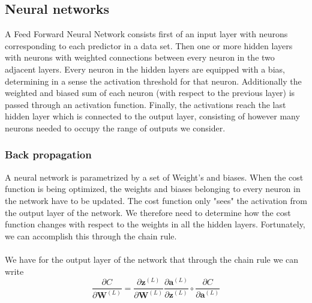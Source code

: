\documentclass[11pt,a4paper,titlepage]{article}
\begin{document}
\subsection{Neural networks}
A Feed Forward Neural Network consists first of an input layer with neurons corresponding to each predictor in a data set. Then one or more hidden layers with neurons with weighted connections between every neuron in the two adjacent layers. Every neuron in the hidden layers are equipped with a bias, determining in a sense the activation threshold for that neuron. Additionally the weighted and biased sum of each neuron (with respect to the previous layer) is passed through an activation function. Finally, the activations reach the last hidden layer which is connected to the output layer, consisting of however many neurons needed to occupy the range of outputs we consider. 
\subsubsection{Back propagation}
A neural network is parametrized by a set of Weight's and biases. When the cost function is being optimized, the weights and biases belonging to every neuron in the network have to be updated. The cost function only "sees" the activation from the output layer of the network. We therefore need to determine how the cost function changes with respect to the weights in all the hidden layers. Fortunately, we can accomplish this through the chain rule.\\\\ We have for the output layer of the network that through the chain rule we can write
\begin{equation}\label{BreakerOfChains}
\frac{\partial C}{\partial \textbf{W}^{(L)}} = \frac{\partial \textbf{z}^{(L)}}{\partial \textbf{W}^{(L)}}\frac{\partial \textbf{a}^{(L)}}{\partial \textbf{z}^{(L)}}\circ \frac{\partial C}{\partial \textbf{a}^{(L)}}
\end{equation}
\end{document}
